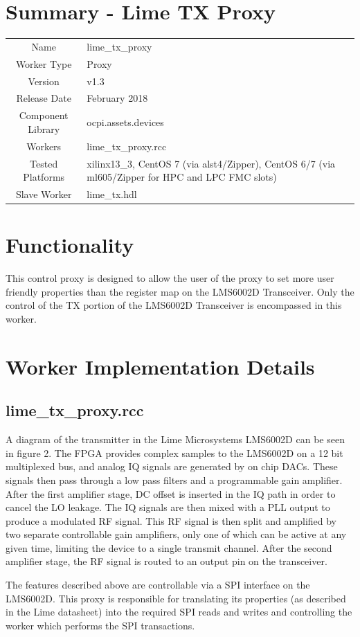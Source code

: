 \documentclass{article}
\author{} %
\date{Version \docVersion} %
\title{\docTitle}
\def\docVersion{1.3}
\def\comp{lime\_tx\_proxy}
\def\Comp{Lime TX Proxy}
\begin{document}
\section*{Summary - \Comp}
\begin{tabular}{|c|M{13.5cm}|}
	\hline
	                  &                \\
	\hline
	Name              & \comp          \\
	\hline
	Worker Type       & Proxy          \\
	\hline
	Version           & v\docVersion \\
	\hline
	Release Date      & February 2018 \\
	\hline
	Component Library & ocpi.assets.devices   \\
	\hline
	Workers           & \comp.rcc      \\
	\hline
	Tested Platforms  & xilinx13\_3, CentOS 7 (via alst4/Zipper), CentOS 6/7 (via ml605/Zipper for HPC and LPC FMC slots) \\
	\hline
	Slave Worker      & lime\_tx.hdl   \\
	\hline
\end{tabular}

\section*{Functionality}
This control proxy is designed to allow the user of the proxy to set more user friendly properties than the register map on the LMS6002D Transceiver.  Only the control of the TX portion of the LMS6002D Transceiver is encompassed in this worker.

\section*{Worker Implementation Details}
\subsection*{\comp.rcc}
A diagram of the transmitter in the Lime Microsystems LMS6002D can be seen in figure 2. The FPGA provides complex samples to the LMS6002D on a 12 bit multiplexed bus, and analog IQ signals are generated by on chip DACs. These signals then pass through a low pass filters and a programmable gain amplifier. After the first amplifier stage, DC offset is inserted in the IQ path in order to cancel the LO leakage. The IQ signals are then mixed with a PLL output to produce a modulated RF signal. This RF signal is then split and amplified by two separate controllable gain amplifiers, only one of which can be active at any given time, limiting the device to a single transmit channel. After the second amplifier stage, the RF signal is routed to an output pin on the transceiver.\par\bigskip
\noindent The features described above are controllable via a SPI interface on the LMS6002D. This proxy is responsible for translating its properties (as described in the Lime datasheet) into the required SPI reads and writes and controlling the worker which performs the SPI transactions.
\newpage
\end{document}
